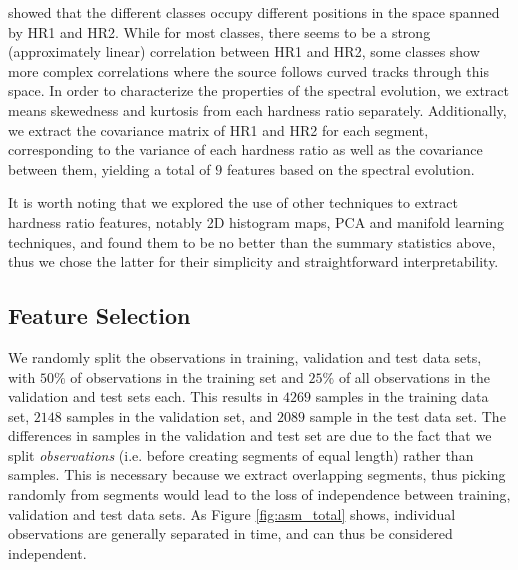 \documentclass[12pt]{emulateapj}
\begin{document}
\citet{belloni2000} showed that the different classes occupy different positions in the space spanned by HR1 and HR2. While for most classes, there seems to be a strong (approximately linear) correlation between HR1 and HR2, some classes show more complex correlations where the source follows curved tracks through this space. In order to characterize the properties of the spectral evolution, we extract means skewedness and kurtosis from each hardness ratio separately. Additionally, we extract the covariance matrix of HR1 and HR2 for each segment, corresponding to the variance of each hardness ratio as well as the covariance between them, yielding a total of $9$ features based on the spectral evolution.

It is worth noting that we explored the use of other techniques to extract hardness ratio features, notably 2D histogram maps, PCA and manifold learning techniques, and found them to be no better than the summary statistics above, thus we chose the latter for their simplicity and straightforward interpretability. 


\subsection{Feature Selection}
\label{sec:featureselection}

We randomly split the observations in training, validation and test data sets, with $50\%$ of observations in the training set and $25\%$ of all observations in the validation and test sets each. This results in $4269$ samples in the training data set, $2148$ samples in the validation set, and $2089$ sample in the test data set.  The differences in samples in the validation and test set are due to the fact that we split \textit{observations} (i.e. before creating segments of equal length) rather than samples. This is necessary because we extract overlapping segments, thus picking randomly from segments would lead to the loss of independence between training, validation and test data sets. As Figure \ref{fig:asm_total} shows, individual observations are generally separated in time, and can thus be considered independent.
\end{document}
